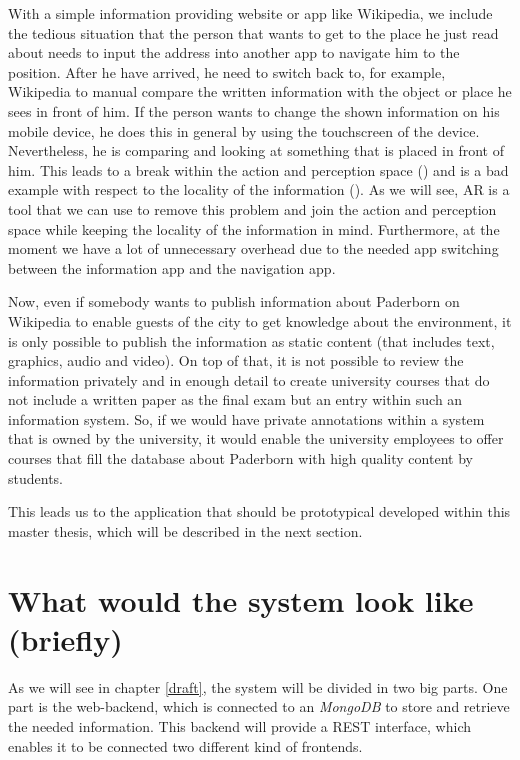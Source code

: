 With a simple information providing website or app like Wikipedia, we include the tedious situation that the person that wants to get to the place he just read about needs to input the address into another app to navigate him to the position. After he have arrived, he need to switch back to, for example, Wikipedia to manual compare the written information with the object or place he sees in front of him. If the person wants to change the shown information on his mobile device, he does this in general by using the touchscreen of the device. Nevertheless, he is comparing and looking at something that is placed in front of him. This leads to a break within the action and perception space (\cite{ham01}) and is a bad example with respect to the locality of the information (\cite{Bon10}). As we will see, \ac{AR} is a tool that we can use to remove this problem and join the action and perception space while keeping the locality of the information in mind.  Furthermore, at the moment we have a lot of unnecessary overhead due to the needed app switching between the information app and the navigation app.   

Now, even if somebody wants to publish information about Paderborn on Wikipedia to enable guests of the city to get knowledge about the environment, it is only possible to publish the information as static content (that includes text, graphics, audio and video). On top of that, it is not possible to review the information privately and in enough detail to create university courses that do not include a written paper as the final exam but an entry within such an information system.  So, if we would have private annotations within a system that is owned by the university, it would enable the university employees to offer courses that fill the database about Paderborn with high quality content by students.

This leads us to the application that should be prototypical developed within this master thesis, which will be described in the next section. 

\section{What would the system look like (briefly)}
As we will see in chapter \ref{draft}, the system will be divided in two big parts. One part is the web-backend, which is connected to an \textit{MongoDB} to store and retrieve the needed information. This backend will provide a \ac{REST} interface, which enables it to be connected two different kind of frontends. 

